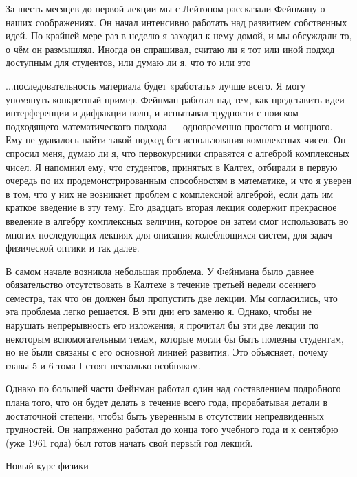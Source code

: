 \documentclass[10pt,oneside]{article}
\begin{document}
За шесть месяцев до первой лекции мы с Лейтоном рассказали Фейнману о наших соображениях. Он начал интенсивно работать над развитием собственных идей. По крайней мере раз в неделю я заходил к нему домой, и мы обсуждали то, о чём он размышлял. Иногда он спрашивал, считаю ли я тот или иной подход доступным для студентов, или думаю ли я, что то или это\par

...последовательность материала будет «работать» лучше всего. Я могу упомянуть конкретный пример. Фейнман работал над тем, как представить идеи интерференции и дифракции волн, и испытывал трудности с поиском подходящего математического подхода --- одновременно простого и мощного. Ему не удавалось найти такой подход без использования комплексных чисел. Он спросил меня, думаю ли я, что первокурсники справятся с алгеброй комплексных чисел. Я напомнил ему, что студентов, принятых в Калтех, отбирали в первую очередь по их продемонстрированным способностям в математике, и что я уверен в том, что у них не возникнет проблем с комплексной алгеброй, если дать им краткое введение в эту тему. Его двадцать вторая лекция содержит прекрасное введение в алгебру комплексных величин, которое он затем смог использовать во многих последующих лекциях для описания колеблющихся систем, для задач физической оптики и так далее.\par

В самом начале возникла небольшая проблема. У Фейнмана было давнее обязательство отсутствовать в Калтехе в течение третьей недели осеннего семестра, так что он должен был пропустить две лекции. Мы согласились, что эта проблема легко решается. В эти дни его заменю я. Однако, чтобы не нарушать непрерывность его изложения, я прочитал бы эти две лекции по некоторым вспомогательным темам, которые могли бы быть полезны студентам, но не были связаны с его основной линией развития. Это объясняет, почему главы 5 и 6 тома I стоят несколько особняком.\par

Однако по большей части Фейнман работал один над составлением подробного плана того, что он будет делать в течение всего года, прорабатывая детали в достаточной степени, чтобы быть уверенным в отсутствии непредвиденных трудностей. Он напряженно работал до конца того учебного года и к сентябрю (уже 1961 года) был готов начать свой первый год лекций.\par

Новый курс физики\par
\end{document}
